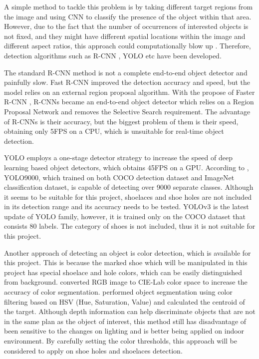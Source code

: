 A simple method to tackle this problem is by taking different target regions from the image and using CNN to classify the presence of the object within that area. However, due to the fact that the number of occurrences of interested objects is not fixed, and they might have different spatial locations within the image and different aspect ratios, this approach could computationally blow up \citep{RCNNFast65:online}. Therefore, detection algorithms such as R-CNN \citep{RCNN}, YOLO \citep{YOLO} etc have been developed. 

The standard R-CNN method is not a complete end-to-end object detector and painfully slow. Fast R-CNN \citep{FastRCNN} improved the detection accuracy and speed, but the model relies on an external region proposal algorithm. With the propose of Faster R-CNN \citep{FasterRCNN}, R-CNNs became an end-to-end object detector which relies on a Region Proposal Network and removes the Selective Search requirement. The advantage of R-CNNs is their accuracy, but the biggest problem of them is their speed, obtaining only 5FPS on a CPU, which is unsuitable for real-time object detection. 

YOLO employs a one-stage detector strategy to increase the speed of deep learning based object detectors, which obtains 45FPS on a GPU. According to \citep{YOLO9000}, YOLO9000, which trained on both COCO detection dataset and ImageNet classification dataset, is capable of detecting over 9000 separate classes. Although it seems to be suitable for this project, shoelaces and shoe holes are not included in its detection range and its accuracy needs to be tested. YOLOv3 \citep{YOLOv3} is the latest update of YOLO family, however, it is trained only on the COCO dataset that consists 80 labels. The category of shoes is not included, thus it is not suitable for this project. 

Another approach of detecting an object is color detection, which is available for this project. This is because the marked shoe which will be manipulated in this project has special shoelace and hole colors, which can be easily distinguished from background. \citep{cie} converted RGB image to CIE-Lab color space to increase the accuracy of color segmentation. \citep{HSV} performed object segmentation using color filtering based on HSV (Hue, Saturation, Value) and calculated the centroid of the target. Although depth information can help discriminate objects that are not in the same plan as the object of interest, this method still has disadvantage of been sensitive to the changes on lighting and is better being applied on indoor environment. By carefully setting the color thresholds, this approach will be considered to apply on shoe holes and shoelaces detection.

